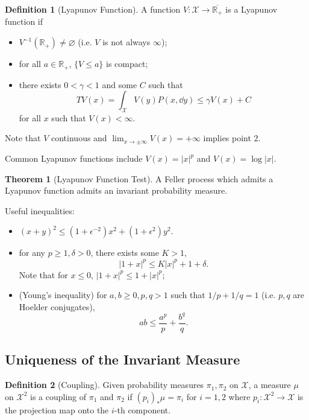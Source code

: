 \documentclass[]{article}
\theoremstyle{definition}
\newtheorem*{theorem}{Theorem}
\newtheorem*{definition}{Definition}
\begin{document}
\begin{definition}[Lyapunov Function]
  A function \(V : \mathcal{X} \to \overline{\mathbb{R}_+}\) is a Lyapunov function 
  if 
  \begin{itemize}
    \item \(V^{-1}(\mathbb{R}_+) \neq \varnothing\) (i.e. \(V\) is not always \(\infty\));
    \item for all \(a \in \mathbb{R}_+\), \(\{V \le a\}\) is compact;
    \item there exists \(0 < \gamma < 1\) and some \(C\) such that 
      \[TV(x) = \int_{\mathcal{X}}V(y) P(x, \dd y) \le \gamma V(x) + C\]
      for all \(x\) such that \(V(x) < \infty\).
  \end{itemize}
\end{definition}

Note that \(V\) continuous and \(\lim_{x \to \pm \infty} V(x) = +\infty\) implies 
point 2.

Common Lyapunov functions include \(V(x) = |x|^p\) and \(V(x) = \log |x|\).

\begin{theorem}[Lyapunov Function Test]
  A Feller process which admits a Lyapunov function admits an invariant probability 
  measure.
\end{theorem}

Useful inequalities:
\begin{itemize}
  \item \((x + y)^2 \le (1+\epsilon^{-2})x^2 + (1+\epsilon^2)y^2\).
  \item for any \(p \ge 1, \delta > 0\), there exists some \(K > 1\),
    \[|1 + x|^p \le K|x|^p + 1 + \delta.\]
    Note that for \(x \le 0\), \(|1 + x|^p \le 1 + |x|^p\);
  \item (Young's inequality) for \(a, b \ge 0, p, q > 1\) such that \(1 / p + 1 / q = 1\)
    (i.e. \(p, q\) are Hoelder conjugates), 
    \[ab \le \frac{a^p}{p} + \frac{b^q}{q}.\]
\end{itemize}

\subsection*{Uniqueness of the Invariant Measure}

\begin{definition}[Coupling]
  Given probability measures \(\pi_1, \pi_2\) on \(\mathcal{X}\), a measure \(\mu\) 
  on \(\mathcal{X}^2\) is a coupling of \(\pi_1\) and \(\pi_2\) if \((p_i)_* \mu = \pi_i\)
  for \(i = 1, 2\) where \(p_i : \mathcal{X}^2 \to \mathcal{X}\) is the projection map 
  onto the \(i\)-th component.
\end{definition}
\end{document}
